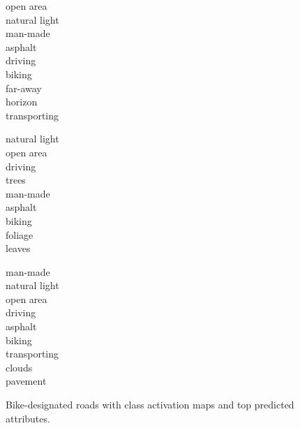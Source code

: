 \documentclass[10pt,twocolumn,letterpaper]{article}
\begin{document}
\begin{figure}[t]
\begin{center}
\vspace{-0.5cm}
\begin{multicols}{3}
\begin{framed}
open area \\
natural light \\
man-made \\
asphalt \\
driving  \\
biking  \\
far-away\\
 horizon \\
  transporting
\end{framed}
\begin{framed}

natural light\\
open area\\
driving\\
trees\\
man-made\\
asphalt\\
biking\\
foliage\\
leaves
\end{framed}
\begin{framed}
man-made\\
natural light\\
open area\\
driving\\
asphalt\\
biking\\
transporting\\
clouds\\
pavement
\end{framed}
\end{multicols}
\end{center}
   \vspace{-0.5cm}
   \caption{Bike-designated roads with class activation maps and top predicted attributes.}
\label{fig:bf_examples}
\end{figure}
\end{document}
